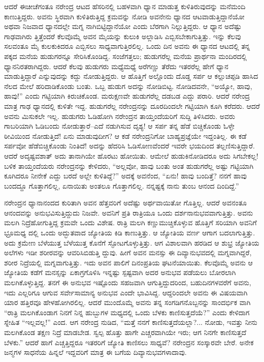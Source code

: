 ಆದರೆ ಈಚೀಚೆಗಂತೂ ನರೇಂದ್ರ ಆಟದ ಹೆಸರಿನಲ್ಲಿ ಬಹಳವಾಗಿ ಧ್ಯಾನ ಮಾಡುತ್ತ ಕುಳಿತಿರುವುದನ್ನು ಮನೆಮಂದಿ ಕಾಣುತ್ತಿದ್ದರು. ಅವನು ಸ್ಥಿರವಾಗಿ ಕುಳಿತಿರುತ್ತಿದ್ದ ಕ್ರಮವನ್ನು ನೋಡಿ ಅವನೇನು ಧ್ಯಾನದ ಆಟವಾಡುತ್ತಿದ್ದಾನೆಯೋ ಅಥವಾ ನಿಜವಾದ ಧ್ಯಾನದಲ್ಲೇ ಮಗ್ನ ನಾಗಿಬಿಟ್ಟಿದ್ದಾನೆಯೋ ಎಂದು ಬೆರಗಾಗಿ ನಿಲ್ಲುತ್ತಿದ್ದರು. ಆ ಧ್ಯಾನ ಅದೆಷ್ಟು ಗಾಢವಾಗಿರು ತ್ತಿತ್ತೆಂದರೆ ಕೆಲವೊಮ್ಮೆ ಅವನ ಮೈಯನ್ನು ಕುಲುಕಿ ಅಲ್ಲಾಡಿಸಿ ಎಬ್ಬಿಸಬೇಕಾಗುತ್ತಿತ್ತು. ಇನ್ನು ಕೆಲವು ಸಲವಂತೂ ಮೈ ಕುಲಕುಕಿದರೂ ಎಬ್ಬಿಸಲು ಸಾಧ್ಯವಾಗುತ್ತಿರಲಿಲ್ಲ. ಒಂದು ದಿನ ಅವನು ಈ ಧ್ಯಾನದ ಆಟದಲ್ಲಿ ತನ್ನ ಪಕ್ಕದ ಮನೆಯ ಹುಡುಗರನ್ನೂ ಸೇರಿಸಿಕೊಂಡಿದ್ದ. ಸಂಜೆಗತ್ತಲು; ಹುಡುಗರೆಲ್ಲ ಮನೆಯ ಪ್ರಾರ್ಥನಾ ಮಂದಿರದಲ್ಲಿ ಧ್ಯಾನನಿರತರಾಗಿದ್ದರು. ಆದರೆ ಕೆಲವು ಹುಡುಗರು ಮಧ್ಯೆಮಧ್ಯೆ ಅರೆಗಣ್ಣು ತೆರೆದು ಇತರರೆಲ್ಲ ಹೇಗೆ ಧ್ಯಾನ ಮಾಡುತ್ತಿದ್ದಾರೆ ಎನ್ನುವುದನ್ನು ಕದ್ದು ನೋಡುತ್ತಿದ್ದರು. ಆ ಹೊತ್ತಿಗೆ ಅಲ್ಲೊಂದು ದೊಡ್ಡ ಸರ್ಪ ಆ ಕಲ್ಲುಚಪ್ಪಡಿ ಹಾಸಿದ ನೆಲದ ಮೇಲೆ ಹರಿದಾಡಿಕೊಂಡು ಬಂತು. ಒಬ್ಬ ಹುಡುಗ ಅದನ್ನು ನೋಡಿಬಿಟ್ಟ. ನೋಡಿದವನೇ, “ಅಯ್ಯೋ, ಹಾವು, ಹಾವು!” ಎಂದು ಗಟ್ಟಿಯಾಗಿ ಕಿರುಚಿಕೊಂಡ. ಮರುಕ್ಷಣವೇ ಹುಡುಗರೆಲ್ಲ ದಡಬಡ ಎದ್ದು ಪರಾರಿ. ಆದರೆ ನರೇಂದ್ರ ಮಾತ್ರ ಗಾಢ ಧ್ಯಾನದಲ್ಲಿ ಕುಳಿತೇ ಇದ್ದ. ಹುಡುಗರೆಲ್ಲ ನರೇಂದ್ರನನ್ನು ದೂರದಿಂದಲೇ ಗಟ್ಟಿಯಾಗಿ ಕೂಗಿ ಕರೆದರು. ಆದರೆ ಅವನು ಮಿಸುಕಲೇ ಇಲ್ಲ. ಹುಡುಗರು ಓಡಿಹೋಗಿ ನರೇಂದ್ರನ ತಾಯ್ತಂದೆಯರಿಗೆ ಸುದ್ದಿ ತಿಳಿಸಿದರು. ಅವರು ಗಾಬರಿಯಾಗಿ ಓಡಿಬಂದು ನೋಡುತ್ತಾರೆ–ಎದೆ ನಡುಗಿಸುವ ದೃಶ್ಯ! ಆ ಸರ್ಪ ತನ್ನ ಹೆಡೆ ಬಿಚ್ಚಿಕೊಂಡು ಓಳ್ಳೇ ಠೀವಿಯಿಂದ ನೋಡುತ್ತಿದೆ! ಏನು ಮಾಡುವುದೀಗ? ಆ ಕಡೆ ನರೇಂದ್ರನಿಗೋ ಬಾಹ್ಯಪ್ರಜ್ಞೆಯೇ ಇದ್ದಂತಿಲ್ಲ. ಈ ಕಡೆ ಸರ್ಪವೋ ಹೆಡೆಬಿಚ್ಚಿಕೊಂಡು ನಿಂತಿದೆ! ಅದನ್ನು ಹೆದರಿಸಿ ಓಡಿಸೋಣವೆಂದರೆ ಇವರೇ ಭಯದಿಂದ ತಲ್ಲಣಿಸುತ್ತಿದ್ದಾರೆ. ಆದರೆ ಅದೃಷ್ಟವಶಾತ್ ಅದು ತಾನಾಗಿಯೇ ಹೊರಟು ಹೋಯಿತು. ಆಮೇಲೆ ಹುಡುಕಿನೋಡಿದರೂ ಅದು ಸಿಗಬೇಕಲ್ಲ! ಬಳಿಕ ತಾಯ್ತಂದೆಯರು ನರೇಂದ್ರನನ್ನು ಕೇಳಿದರು, “ಅಲ್ಲವೋ, ಹಾವು ಬಂತು ಅಂತ ಹುಡುಗರೆಲ್ಲ ಅಷ್ಟು ಗಟ್ಟಿಯಾಗಿ ಕೂಗಿದರೂ ನೀನೇಕೆ ಎದ್ದು ಬರದೆ ಅಲ್ಲೇ ಕುಳಿತಿದ್ದೆ?” ಅದಕ್ಕೆ ಅವನೆಂದ, “ಏನು! ಹಾವು ಬಂದಿತ್ತೆ? ನನಗೆ ಹಾವು ಬಂದದ್ದೂ ಗೊತ್ತಾಗಲಿಲ್ಲ, ಏನಾಯಿತು ಅಂತಲೂ ಗೊತ್ತಾಗಲಿಲ್ಲ. ನನ್ನಷ್ಟಕ್ಕೆ ನಾನು ತುಂಬ ಆನಂದ ದಿಂದಿದ್ದೆ.”

ನರೇಂದ್ರನ ಧ್ಯಾನಾನಂದದ ಕುರಿತಾಗಿ ಅವನ ಹೆತ್ತವರಿಗೆ ಅದೆಷ್ಟು ಅರ್ಥವಾಯಿತೋ ಗೊತ್ತಿಲ್ಲ. ಆದರೆ ಅವನಂತೂ ಆನಂದವನ್ನು ಅನುಭವಿಸುತ್ತಿದ್ದುದು ನಿಜವೇ. ಅವನಿಗೆ ಪ್ರತಿ ರಾತ್ರಿಯೂ ಒಂದು ದರ್ಶನಾನುಭವವಾಗುತ್ತಿತ್ತು. ಅವನು ಮಲಗಿ ನಿದ್ರೆಹೋಗುತ್ತಿದ್ದ ಕ್ರಮವೇ ಒಂದು ವಿಶೇಷ. ರಾತ್ರಿ ಮಲಗಿ ಕಣ್ಣುಮುಚ್ಚಿಕೊಳ್ಳುವ ಹೊತ್ತಿಗೆ ಸರಿಯಾಗಿ ಅವನಿಗೆ ಭ್ರೂಮಧ್ಯ ದಲ್ಲಿ ಒಂದು ಅದ್ಭುತವಾದ ಜ್ಯೋತಿಯ ಕಿಡಿ ಕಾಣುತ್ತಿತ್ತು. ಆ ಜ್ಯೋತಿಯ ವರ್ಣ ಆಗಾಗ ಬದಲಾಗುತ್ತಿತ್ತು. ಅದು ಕ್ರಮೇಣ ಬೆಳೆಯುತ್ತ ಬೆಳೆಯುತ್ತ ಕೊನೆಗೆ ಸ್ಫೋಟಗೊಳ್ಳುತ್ತಿತ್ತು. ಆಗ ವಿಶಾಲವಾಗಿ ಹರಡಿದ ಆ ಶುಭ್ರ ಜ್ಯೋತಿಯ ಅಲೆಗಳು ಇಡೀ ಶರೀರವನ್ನು ಆವರಿಸಿಬಿಡುತ್ತಿ ದ್ದುವು. ಹೀಗೆ ಅವನ ಮನಸ್ಸು ಈ ದಿವ್ಯಾನುಭವದಲ್ಲಿ ಮಗ್ನವಾಗಿದ್ದರೆ, ಶರೀರ ನಿದ್ರೆಯಲ್ಲಿ ಮಗ್ನವಾಗುತ್ತಿತ್ತು. ಇದು ಅವನ ಪಾಲಿಗೆ ದಿನಂಪ್ರತಿಯ ಘಟನೆಯಾಯಿತು. ಕೆಲವೊಮ್ಮೆ ಅವನು ಆ ಜ್ಯೋತಿಯ ಕಡೆಗೆ ಮನಸ್ಸನ್ನು ಏಕಾಗ್ರಗೊಳಿಸಿ ಇನ್ನಷ್ಟು ಸ್ಪಷ್ಟವಾಗಿ ಅದರ ಅನುಭವ ಪಡೆಯಲು ಬೋರಲಾಗಿ ಮಲಗಿಕೊಳ್ಳುತ್ತಿದ್ದ. ತನಗೆ ಈ ಅನುಭವ ಇಷ್ಟೊಂದು ಸಹಜವಾಗಿ ಆಗುತ್ತಿದ್ದುದರಿಂದ, ಬಹುದಿನಗಳವರೆಗೆ ಅವನು, ಇದು ಎಲ್ಲರಿಗೂ ಆಗುವ ಸರ್ವೇಸಾಮಾನ್ಯ ಅನುಭವ ಎಂದೇ ಭಾವಿಸಿದ್ದ. ಆದ್ದರಿಂದಲೇ ಅವನು ಈ ವಿಷಯವಾಗಿ ಯಾರ ಹತ್ತಿರವೂ ಹೇಳಹೋಗಿರಲಿಲ್ಲ. ಆದರೆ ಮುಂದೊಮ್ಮೆ ಅವನು ತನ್ನ ಸಂಗಡಿಗನೊಬ್ಬನನ್ನು ಸಾಂದರ್ಭಿಕ ವಾಗಿ “ರಾತ್ರಿ ಮಲಗಿಕೊಂಡಾಗ ನಿನಗೆ ನಿನ್ನ ಹುಬ್ಬುಗಳ ಮಧ್ಯದಲ್ಲಿ ಒಂದು ಬೆಳಕು ಕಾಣಿಸುತ್ತದೆಯೆ?” ಎಂದು ಕೇಳಿದಾಗ ಸ್ನೇಹಿತ “ಇಲ್ಲವಲ್ಲ!” ಎಂದ. ಆಗ ನರೇಂದ್ರ ನುಡಿದ, “ಮತ್ತೆ ನನಗೆ ಕಾಣಿಸುತ್ತದೆಯಲ್ಲಾ?... ನೋಡು, ಇವತ್ತು ನೀನು ಮಲಗಿಕೊಂಡ ತಕ್ಷಣ ನಿದ್ರೆ ಮಾಡಬೇಡ. ಸ್ವಲ್ಪ ಹೊತ್ತು ಹಾಗೇ ಎಚ್ಚರವಾಗಿಯೇ ಇರು; ಆಗ ನಿನಗೇ ಕಾಣಿಸುತ್ತದೆ ಬೆಳಕು.” ಆದರೆ ಹಾಗೆ ಎಚ್ಚತ್ತಿದ್ದರೂ ಇತರರಿಗೆ ಜ್ಯೋತಿ ಕಾಣಿಸಲು ಸಾಧ್ಯವೆ? ನರೇಂದ್ರನ ಸಂಸ್ಕಾರವೇ ಬೇರೆ. ಅನೇಕ ಜನ್ಮಗಳ ಸಾಧನೆಯ ಹಿನ್ನಲೆ ಇದ್ದವರಿಗೆ ಮಾತ್ರ ಈ ಬಗೆಯ ದಿವ್ಯಾನುಭವಗಳಾದಾವು.

